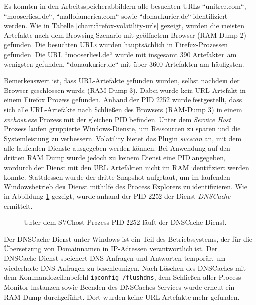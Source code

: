 Es konnten in den Arbeitsspeicherabbildern alle besuchten URLs ``unitree.com``, ``mooserliesl.de``, ``mallofamerica.com`` sowie ``donaukurier.de`` identifiziert werden.
Wie in Tabelle \ref{chart:firefox-volatility-urls} gezeigt, wurden die meisten Artefakte nach dem Browsing-Szenario mit geöffnetem Browser (RAM Dump 2) gefunden. Die besuchten URLs wurden hauptsächlich in Firefox-Prozessen gefunden. Die URL ``mooserliesl.de`` wurde mit insgesamt 390 Artefakten am wenigsten gefunden, ``donaukurier.de`` mit über 3600 Artefakten am häufigsten.

Bemerkenswert ist, dass URL-Artefakte gefunden wurden, selbst nachdem der Browser geschlossen wurde (RAM Dump 3). Dabei wurde kein URL-Artefakt in einem Firefox Prozess gefunden.
Anhand der PID 2252 wurde festgestellt, dass sich alle URL-Artefakte nach Schließen des Browsers (RAM-Dump 3) in einem \textit{svchost.exe} Prozess mit der gleichen PID befinden. Unter dem \textit{Service Host} Prozess laufen gruppierte Windows-Dienste, um Ressourcen zu sparen und die Systemleistung zu verbessern.
Volatility bietet das Plugin \textit{svcscan} an, mit dem alle laufenden Dienste ausgegeben werden können.
Bei Anwendung auf den dritten RAM Dump wurde jedoch zu keinem Dienst eine PID angegeben, wordurch der Dienst mit den URL Artefakten nicht im RAM identifiziert werden konnte. \cite{Nicholasswhite.05.06.2023}
Stattdessen wurde der dritte Snapshot aufgetaut, um im laufenden Windowsbetrieb den Dienst mithilfe des Process Explorers zu identifizieren.
Wie in Abbildung \ref{chart:svchost-dnscache} gezeigt, wurde anhand der PID $2252$ der Dienst \textit{DNSCache} ermittelt.
\begin{figure}[h!]
	\centerline{}
	\caption{Unter dem SVChost-Prozess PID $2252$ läuft der DNSCache-Dienst.}
	\label{chart:svchost-dnscache}  
\end{figure}
Der DNSCache-Dienst unter Windows ist ein Teil des Betriebssystems, der für die Übersetzung von Domainnamen in IP-Adressen verantwortlich ist. Der DNSCache-Dienst speichert DNS-Anfragen und Antworten temporär, um wiederholte DNS-Anfragen zu beschleunigen. \cite{MicrosoftLearn.05.06.2023}
Nach Löschen des DNSCaches mit dem Kommandozeilenbefehl \texttt{ipconfig /flushdns}, dem Schließen aller Process Monitor Instanzen sowie Beenden des DNSCaches Services wurde erneut ein RAM-Dump durchgeführt. Dort wurden keine URL Artefakte mehr gefunden.

